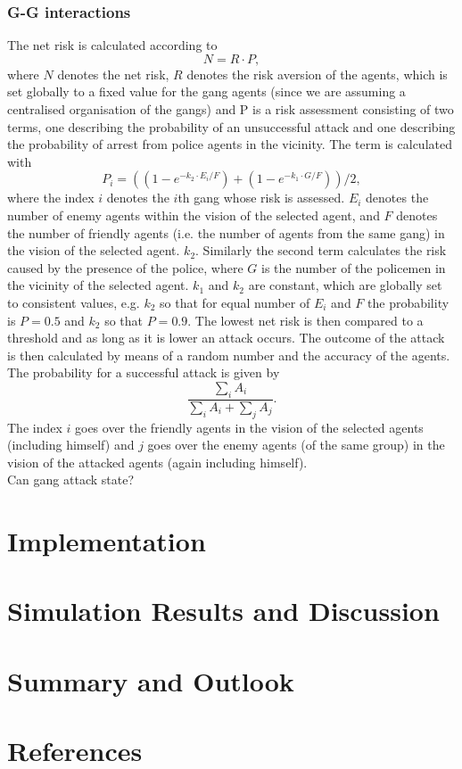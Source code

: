 \documentclass[11pt]{article}
\begin{document}
\subsubsection{G-G interactions}
The net risk is calculated according to
\begin{equation}
N=R\cdot P,
\end{equation}
where $N$ denotes the net risk, $R$ denotes the risk aversion of the agents, which is set globally to a fixed value for the gang agents (since we are assuming a centralised organisation of the gangs) and P is a risk assessment consisting of two terms, one describing the probability of an unsuccessful attack and one describing the probability of arrest from police agents in the vicinity. The term is calculated with
\begin{equation}
P_i=((1-e^{-k_2\cdot E_i/F})+(1-e^{-k_1\cdot G/F}))/2,
\end{equation}
where the index $i$ denotes the $i$th gang whose risk is assessed. $E_i$ denotes the number of enemy agents within the vision of the selected agent, and $F$ denotes the number of friendly agents (i.e. the number of agents from the same gang) in the vision of the selected agent. $k_2$. Similarly the second term calculates the risk caused by the presence of the police, where $G$ is the number of the policemen in the vicinity of the selected agent. $k_1$ and $k_2$ are constant, which are globally set to consistent values, e.g. $k_2$  so that for equal number of $E_i$ and $F$ the probability is $P=0.5$  and $k_2$ so that $P=0.9$.\cite{epstein} The lowest net risk is then compared to a threshold and as long as it is lower an attack occurs. The outcome of the attack is then calculated by means of a random number and the accuracy of the agents. The probability for a successful attack is given by
\begin{equation}
\frac{\sum_iA_i}{\sum_iA_i+\sum_jA_j}.
\end{equation}
The index $i$ goes over the friendly agents in the vision of the selected agents (including himself) and $j$ goes over the enemy agents (of the same group) in the vision of the attacked agents (again including himself).\\
Can gang attack state?

\section{Implementation}

\section{Simulation Results and Discussion}

\section{Summary and Outlook}

\section{References}
\end{document}
